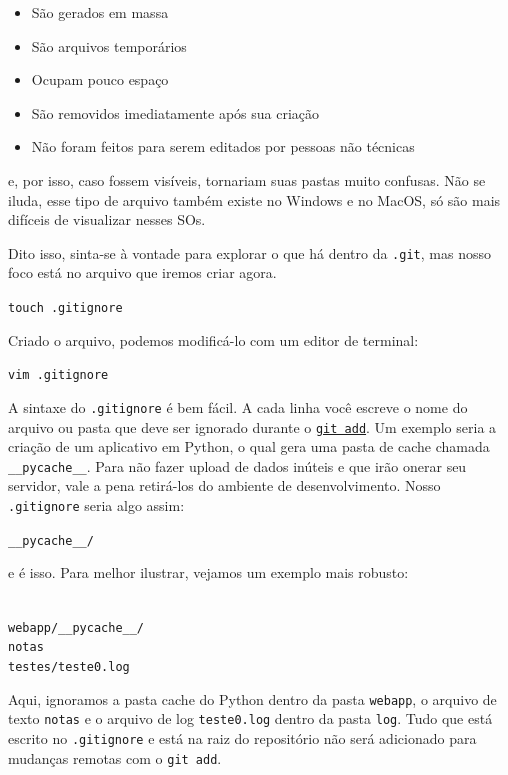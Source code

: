 \documentclass{article}
\begin{document}
  \begin{itemize}
	\item{São gerados em massa}
	\item{São arquivos temporários}
	\item{Ocupam pouco espaço}
	\item{São removidos imediatamente após sua criação}
	\item{Não foram feitos para serem editados por pessoas não técnicas}
  \end{itemize}

  e, por isso, caso fossem visíveis, tornariam suas pastas muito confusas. Não se iluda, esse tipo de arquivo também existe no 
  Windows e no MacOS, só são mais difíceis de visualizar nesses SOs. 
  
  Dito isso, sinta-se à vontade para explorar o que há dentro da \texttt{.git}, mas nosso foco está no arquivo que iremos criar
  agora.

  \vspace{1ex}
  \texttt{touch .gitignore}
  \vspace{1ex}

  Criado o arquivo, podemos modificá-lo com um editor de terminal:  

  \vspace{1ex}
  \texttt{vim .gitignore}
  \vspace{1ex}

  A sintaxe do \texttt{.gitignore} é bem fácil. A cada linha você escreve o nome do arquivo ou pasta que deve 
  ser ignorado durante o \href{sec:add}{\texttt{git add}}. Um exemplo seria a criação de um aplicativo em 
  Python, o qual gera uma pasta de cache chamada \texttt{\_\_pycache\_\_}. Para não fazer upload de dados inúteis e que 
  irão onerar seu servidor, vale a pena retirá-los do ambiente de desenvolvimento. Nosso \texttt{.gitignore} seria algo assim: 

  \vspace{1ex}
  \texttt{\_\_pycache\_\_/}
  \vspace{1ex}

  e é isso. Para melhor ilustrar, vejamos um exemplo mais robusto: 
  
  \vspace{1ex}
  \texttt{\\ 
  \noindent webapp/\_\_pycache\_\_/  \\ 
  \noindent notas \\ 
  \noindent testes/teste0.log}
  \vspace{1ex}

  Aqui, ignoramos a pasta cache do Python dentro da pasta \texttt{webapp}, o arquivo de texto \texttt{notas} e o arquivo 
  de log \texttt{teste0.log} dentro da pasta \texttt{log}. Tudo que está escrito no \texttt{.gitignore} e está na raiz 
  do repositório não será adicionado para mudanças remotas com o \texttt{git add}.
  
  
\end{document}
